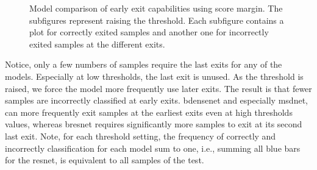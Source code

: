 \begin{minipage}{\linewidth}
\begin{figure}
		\hfill
		\hfill
		\hfill
		\hfill
		
		\caption[Model comparison of early exit capabilities]{Model comparison of early exit capabilities using score margin. The subfigures represent raising the threshold. Each subfigure contains a plot for correctly exited samples and another one for incorrectly exited samples at the different exits. }
		\label{fig:model_threshold_comparison}
	\end{figure}
	
\end{minipage}

Notice, only a few numbers of samples require the last exits for any of the models. Especially at low thresholds, the last exit is unused. As the threshold is raised, we force the model more frequently use later exits. The result is that fewer samples are incorrectly classified at early exits. \gls{bdensenet} and especially \gls{msdnet}, can more frequently exit samples at the earliest exits even at high thresholds values, whereas \gls{bresnet} requires significantly more samples to exit at its second last exit.
Note, for each threshold setting, the frequency of correctly and incorrectly classification for each model sum to one, i.e., summing all blue bars for the \gls{resnet}, is equivalent to all samples of the test.

